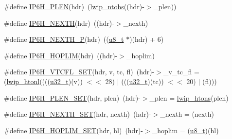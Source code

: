 \begin{DoxyCompactItemize}
\#define \hyperlink{openmote-cc2538_2lwip_2src_2include_2lwip_2prot_2ip6_8h_ac672706ee00b07f263dad7dcf116d351}{I\+P6\+H\+\_\+\+P\+L\+EN}(hdr)~(\hyperlink{openmote-cc2538_2lwip_2src_2include_2lwip_2def_8h_ac642bf6057869696d7807564d8309ffc}{lwip\+\_\+ntohs}((hdr)-\/$>$\+\_\+plen))
\item 
\#define \hyperlink{openmote-cc2538_2lwip_2src_2include_2lwip_2prot_2ip6_8h_a11009a147aa680a6a486ded85382aff1}{I\+P6\+H\+\_\+\+N\+E\+X\+TH}(hdr)~((hdr)-\/$>$\+\_\+nexth)
\item 
\#define \hyperlink{openmote-cc2538_2lwip_2src_2include_2lwip_2prot_2ip6_8h_adc6c59e0bfc927c6770d7b01323a87d5}{I\+P6\+H\+\_\+\+N\+E\+X\+T\+H\+\_\+P}(hdr)~((\hyperlink{group__compiler__abstraction_ga4caecabca98b43919dd11be1c0d4cd8e}{u8\+\_\+t} $\ast$)(hdr) + 6)
\item 
\#define \hyperlink{openmote-cc2538_2lwip_2src_2include_2lwip_2prot_2ip6_8h_a4f8209d53443b50770e57426d027de28}{I\+P6\+H\+\_\+\+H\+O\+P\+L\+IM}(hdr)~((hdr)-\/$>$\+\_\+hoplim)
\item 
\#define \hyperlink{openmote-cc2538_2lwip_2src_2include_2lwip_2prot_2ip6_8h_a932e7c887bb04691075a8c36c61736e4}{I\+P6\+H\+\_\+\+V\+T\+C\+F\+L\+\_\+\+S\+ET}(hdr,  v,  tc,  fl)~(hdr)-\/$>$\+\_\+v\+\_\+tc\+\_\+fl = (\hyperlink{openmote-cc2538_2lwip_2src_2core_2def_8c_a14f94347a5b9b9e3602705b75b7ae524}{lwip\+\_\+htonl}((((\hyperlink{group__compiler__abstraction_ga4c14294869aceba3ef9d4c0c302d0f33}{u32\+\_\+t})(v)) $<$$<$ 28) $\vert$ (((\hyperlink{group__compiler__abstraction_ga4c14294869aceba3ef9d4c0c302d0f33}{u32\+\_\+t})(tc)) $<$$<$ 20) $\vert$ (fl)))
\item 
\#define \hyperlink{openmote-cc2538_2lwip_2src_2include_2lwip_2prot_2ip6_8h_a2d727ccfecc56fb1e35ea4f7249f399b}{I\+P6\+H\+\_\+\+P\+L\+E\+N\+\_\+\+S\+ET}(hdr,  plen)~(hdr)-\/$>$\+\_\+plen = \hyperlink{openmote-cc2538_2lwip_2src_2core_2def_8c_ad637280639de4066392e6b5614fa3e56}{lwip\+\_\+htons}(plen)
\item 
\#define \hyperlink{openmote-cc2538_2lwip_2src_2include_2lwip_2prot_2ip6_8h_a85d62e6278b0bed9e3b88df777be612c}{I\+P6\+H\+\_\+\+N\+E\+X\+T\+H\+\_\+\+S\+ET}(hdr,  nexth)~(hdr)-\/$>$\+\_\+nexth = (nexth)
\item 
\#define \hyperlink{openmote-cc2538_2lwip_2src_2include_2lwip_2prot_2ip6_8h_aaa72852834526961a3fb2cbc07fe602d}{I\+P6\+H\+\_\+\+H\+O\+P\+L\+I\+M\+\_\+\+S\+ET}(hdr,  hl)~(hdr)-\/$>$\+\_\+hoplim = (\hyperlink{group__compiler__abstraction_ga4caecabca98b43919dd11be1c0d4cd8e}{u8\+\_\+t})(hl)
\end{DoxyCompactItemize}
